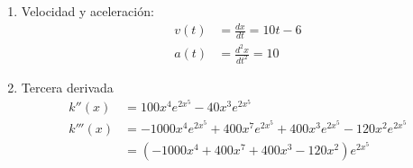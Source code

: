 \documentclass{article}
\begin{document}
\begin{enumerate}
\item Velocidad y aceleración:
\begin{align*}
v(t) &= \frac{dx}{dt} = 10t -6 \\
a(t) &= \frac{d^2x}{dt^2} = 10
\end{align*}

\item Tercera derivada
\begin{align*}
k''(x)  &= 100x^{4} e^{2x^{5}} -40x^3 e^{2x^{5}} \\
k'''(x) &= -1000x^{4} e^{2x^{5}} + 400 x^{7} e^{2x^{5}} + 
            400x^{3} e^{2x^{5}} - 120 x^{2} e^{2x^{5}} \\
        &= (-1000x^{4} + 400 x^{7} + 400x^{3} - 120 x^{2}) e^{2x^{5}} \\
\end{align*}

\end{enumerate}
\end{document}
